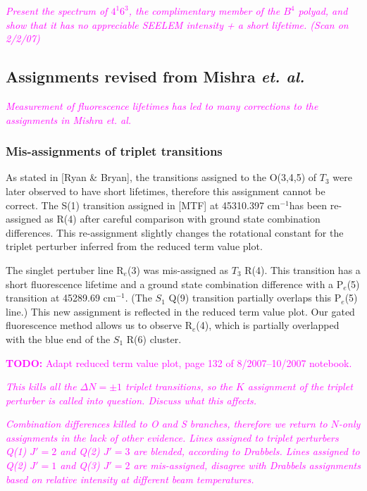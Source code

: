\documentclass[12pt]{mitthesis}
\newcommand{\TODO} [1]{\textcolor{magenta}{\textbf{TODO:} #1}}
\newcommand{\POINT}[1]{\textcolor{magenta}{\emph{#1}}}
\newcommand{\rcm}{cm$^{-1}$}
\begin{document}
\POINT{Present the spectrum of $4^1 6^3$, the complimentary member of
  the $B^4$ polyad, and show that it has no appreciable SEELEM
  intensity + a short lifetime. (Scan on 2/2/07)}

\subsection{Assignments revised from Mishra \emph{et. al.}}

\POINT{Measurement of fluorescence lifetimes has led to many
  corrections to the assignments in Mishra \emph{et. al.}}

\subsubsection{Mis-assignments of triplet transitions}

As stated in [Ryan \& Bryan], the transitions assigned to the O(3,4,5)
of $T_3$ were later observed to have short lifetimes, therefore this
assignment cannot be correct.  The S(1) transition assigned in [MTF]
at 45310.397 \rcm has been re-assigned as R(4) after careful
comparison with ground state combination differences.  This
re-assignment slightly changes the rotational constant for the triplet
perturber inferred from the reduced term value plot.

The singlet pertuber line R$_e$(3) was mis-assigned as $T_3$ R(4).
This transition has a short fluorescence lifetime and a ground state
combination difference with a P$_e$(5) transition at 45289.69 \rcm.
(The $S_1$ Q(9) transition partially overlaps this P$_e$(5) line.)
This new assignment is reflected in the reduced term value plot.  Our
gated fluorescence method allows us to observe R$_e$(4), which is
partially overlapped with the blue end of the $S_1$ R(6) cluster.

\TODO{Adapt reduced term value plot, page 132 of 8/2007--10/2007
  notebook.}

\POINT{This kills all the $\Delta N=\pm 1$ triplet transitions, so the
  $K$ assignment of the triplet perturber is called into question.
  Discuss what this affects.}

\POINT{Combination differences killed to O and S branches, therefore
  we return to $N$-only assignments in the lack of other evidence.
  Lines assigned to triplet perturbers Q(1) $J'=2$ and Q(2) $J'=3$ are
  blended, according to Drabbels.  Lines assigned to Q(2) $J'=1$ and
  Q(3) $J'=2$ are mis-assigned, disagree with Drabbels assignments
  based on relative intensity at different beam temperatures.}
\end{document}
